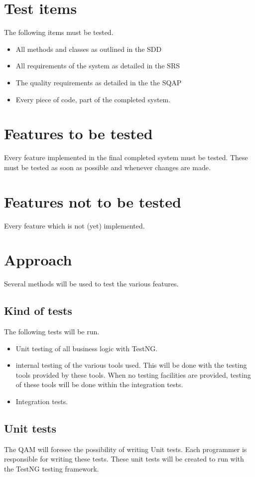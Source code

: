 \documentclass[salesmen, twoside]{../../../templates/latex/2009/softproj}
\begin{document}
\begin{projdoc}
\section{Test items}
The following items must be tested.
\begin{itemize}
\item
All methods and classes as outlined in the SDD\cite{SDD}
\item
All requirements of the system as detailed in the SRS\cite{SRS}
\item
The quality requirements as detailed in the the SQAP\cite{SQAP}
\item
Every piece of code, part of the completed system.
\end{itemize}


\section{Features to be tested}
Every feature implemented in the final completed system must be tested. These must be tested as soon as possible and whenever changes are made.

\section{Features not to be tested}
Every feature which is not (yet) implemented.

\section{Approach}
Several methods will be used to test the various features.

\subsection{Kind of tests}
The following tests will be run.
\begin{itemize}
\item
Unit testing of all business logic with TestNG\cite{testNG}.
\item
internal testing of the various tools used. This will be done with the testing tools provided by these tools. When no testing facilities are provided, testing of these tools will be done within the integration tests.
\item
Integration tests.
\end{itemize}

\subsection{Unit tests}
The QAM will foresee the possibility of writing Unit tests. Each programmer is responsible for writing these tests. These unit tests will be created to run with the TestNG\cite{testNG} testing framework. 


\end{projdoc}
\end{document}
